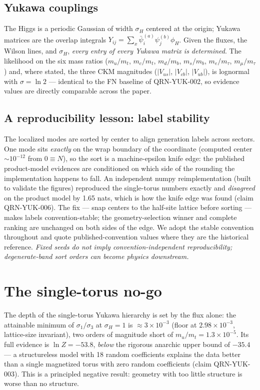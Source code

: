 \documentclass[aps,prd,preprint,nofootinbib]{revtex4-2}
\begin{document}
\subsection{Yukawa couplings}

The Higgs is a periodic Gaussian of width $\sigma_H$ centered at the origin;
Yukawa matrices are the overlap integrals
$Y_{ij}=\sum_x \bar\psi_i^{(a)}\psi_j^{(b)}\phi_H$. Given the fluxes, the
Wilson lines, and $\sigma_H$, \emph{every entry of every Yukawa matrix is
determined}. The likelihood on the six mass ratios ($m_u/m_t$, $m_c/m_t$,
$m_d/m_b$, $m_s/m_b$, $m_e/m_\tau$, $m_\mu/m_\tau$) and, where stated, the
three CKM magnitudes ($|V_{us}|$, $|V_{cb}|$, $|V_{ub}|$), is lognormal with
$\sigma=\ln 2$ --- identical to the FN baseline of QRN-YUK-002, so evidence
values are directly comparable across the paper.

\subsection{A reproducibility lesson: label stability}
\label{sec:label}

The localized modes are sorted by center to align generation labels across
sectors. One mode sits \emph{exactly} on the wrap boundary of the coordinate
(computed center $\sim 10^{-12}$ from $0\equiv N$), so the sort is a
machine-epsilon knife edge: the published product-model evidences are
conditioned on which side of the rounding the implementation happens to fall.
An independent numpy reimplementation (built to validate the figures)
reproduced the single-torus numbers exactly and \emph{disagreed} on the product
model by 1.65 nats, which is how the knife edge was found (claim QRN-YUK-006).
The fix --- snap centers to the half-site lattice before sorting --- makes
labels convention-stable; the geometry-selection winner and complete ranking
are unchanged on both sides of the edge. We adopt the stable convention
throughout and quote published-convention values where they are the historical
reference. \emph{Fixed seeds do not imply convention-independent
reproducibility; degenerate-band sort orders can become physics downstream.}

\section{The single-torus no-go}

The depth of the single-torus Yukawa hierarchy is set by the flux alone: the
attainable minimum of $\sigma_1/\sigma_3$ at $\sigma_H=1$ is $\approx 3\times
10^{-3}$ (floor at $2.98\times 10^{-3}$, lattice-size invariant), two orders of
magnitude short of $m_u/m_t=1.3\times 10^{-5}$. Its full evidence is $\ln
Z=-53.8$, \emph{below} the rigorous anarchic upper bound of $-35.4$ --- a
structureless model with 18 random coefficients explains the data better than a
single magnetized torus with zero random coefficients (claim QRN-YUK-003). This
is a principled negative result: geometry with too little structure is worse
than no structure.
\end{document}
